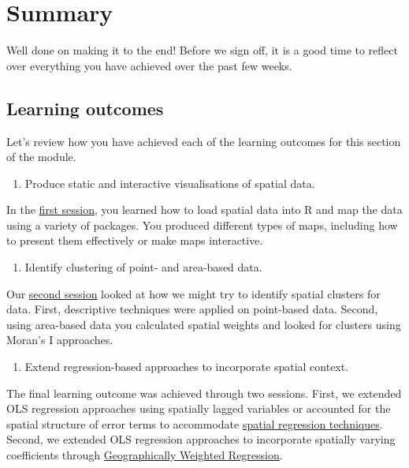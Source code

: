 \documentclass[
]{book}
\providecommand{\tightlist}{%
  \setlength{\itemsep}{0pt}\setlength{\parskip}{0pt}}
\begin{document}
\hypertarget{summary}{%
\chapter{Summary}\label{summary}}

Well done on making it to the end! Before we sign off, it is a good time to reflect over everything you have achieved over the past few weeks.

\hypertarget{learning-outcomes-1}{%
\section{Learning outcomes}\label{learning-outcomes-1}}

Let's review how you have achieved each of the learning outcomes for this section of the module.

\begin{enumerate}
\def\labelenumi{\arabic{enumi}.}
\tightlist
\item
  Produce static and interactive visualisations of spatial data.
\end{enumerate}

In the \protect\hyperlink{intro}{first session}, you learned how to load spatial data into R and map the data using a variety of packages. You produced different types of maps, including how to present them effectively or make maps interactive.

\begin{enumerate}
\def\labelenumi{\arabic{enumi}.}
\setcounter{enumi}{1}
\tightlist
\item
  Identify clustering of point- and area-based data.
\end{enumerate}

Our \protect\hyperlink{cluster}{second session} looked at how we might try to identify spatial clusters for data. First, descriptive techniques were applied on point-based data. Second, using area-based data you calculated spatial weights and looked for clusters using Moran's I approaches.

\begin{enumerate}
\def\labelenumi{\arabic{enumi}.}
\setcounter{enumi}{2}
\tightlist
\item
  Extend regression-based approaches to incorporate spatial context.
\end{enumerate}

The final learning outcome was achieved through two sessions. First, we extended OLS regression approaches using spatially lagged variables or accounted for the spatial structure of error terms to accommodate \protect\hyperlink{spatreg}{spatial regression techniques}. Second, we extended OLS regression approaches to incorporate spatially varying coefficients through \protect\hyperlink{gwr}{Geographically Weighted Regression}.
\end{document}
